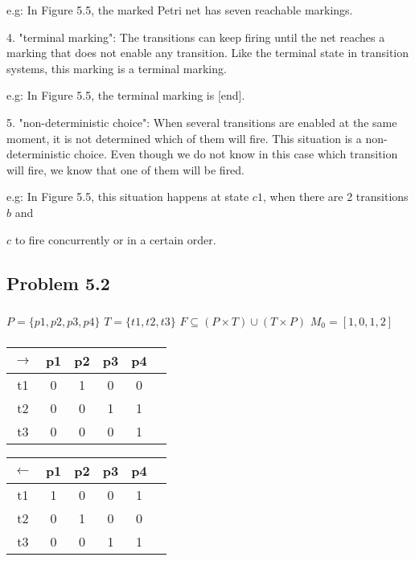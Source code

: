 \documentclass[a4paper]{article}
\begin{document}
e.g: In Figure 5.5, the marked Petri net has seven reachable markings.
\par\null\par
4. "terminal marking": The transitions can keep firing until the net reaches a marking that does not enable any transition. Like the terminal state in transition systems, this marking is a terminal marking.\par
e.g: In Figure 5.5, the terminal marking is [end].
\par\null\par
5. "non-deterministic choice": When several transitions are enabled at the same moment, it is not determined which of them will fire. This situation is a non-deterministic choice. Even though we do not know in this case which transition will fire, we know that one of them will be fired.\par
e.g: In Figure 5.5, this situation happens at state $c1$, when there are 2 transitions $b$ and\par
$c$ to fire concurrently or in a certain order.

\subsection{Problem 5.2}
\subsubsection{}
$P = \{p1, p2, p3, p4\}$\newline
$T = \{t1, t2, t3\}$\newline
$F \subseteq (P \times T) \cup (T \times P)$\newline
$M_0 = [1, 0, 1, 2]$
\subsubsection{}
\begin{center}
    \begin{tabular}{|c|c|c|c|c|c|}
    \hline
        $\rightarrow$ & p1 & p2 & p3 & p4\\
    \hline
        t1 & 0 & 1 & 0 & 0\\
    \hline
        t2 & 0 & 0 & 1 & 1\\
    \hline
        t3 & 0 & 0 & 0 & 1\\
    \hline
    \end{tabular}
\end{center}
\begin{center}
    \begin{tabular}{|c|c|c|c|c|c|}
    \hline
        $\leftarrow$ & p1 & p2 & p3 & p4\\
    \hline
        t1 & 1 & 0 & 0 & 1\\
    \hline
        t2 & 0 & 1 & 0 & 0\\
    \hline
        t3 & 0 & 0 & 1 & 1\\
    \hline
    \end{tabular}
\end{center}
\end{document}
